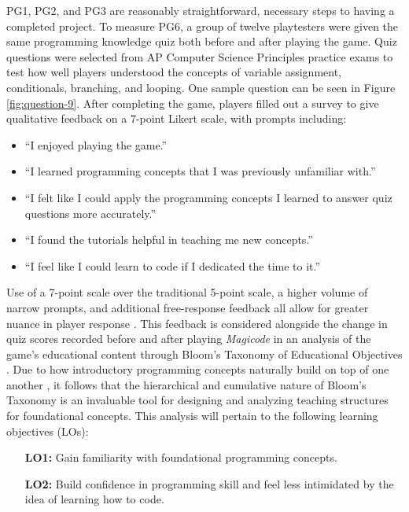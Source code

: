 \documentclass[10pt,twocolumn]{article}
\begin{document}
PG1, PG2, and PG3 are reasonably straightforward, necessary steps to having a completed project. To measure PG6, a group of twelve playtesters were given the same programming knowledge quiz both before and after playing the game. Quiz questions were selected from AP Computer Science Principles practice exams \cite{ap-practice-exam}\cite{ap-practice-website} to test how well players understood the concepts of variable assignment, conditionals, branching, and looping. One sample question can be seen in Figure \ref{fig:question-9}. After completing the game, players filled out a survey to give qualitative feedback on a 7-point Likert scale, with prompts including:

\begin{itemize}
    \item “I enjoyed playing the game.”
    \item “I learned programming concepts that I was previously unfamiliar with.”
    \item “I felt like I could apply the programming concepts I learned to answer quiz questions more accurately.”
    \item “I found the tutorials helpful in teaching me new concepts.”
    \item “I feel like I could learn to code if I dedicated the time to it.”
\end{itemize}

Use of a 7-point scale over the traditional 5-point scale, a higher volume of narrow prompts, and additional free-response feedback all allow for greater nuance in player response \cite{likert-explored}. This feedback is considered alongside the change in quiz scores recorded before and after playing \textit{Magicode} in an analysis of the game’s educational content through Bloom’s Taxonomy of Educational Objectives \cite{bloom-taxonomy}. Due to how introductory programming concepts naturally build on top of one another \cite{teaching-oop}, it follows that the hierarchical and cumulative nature of Bloom’s Taxonomy is an invaluable tool for designing and analyzing teaching structures for foundational concepts. This analysis will pertain to the following learning objectives (LOs):

\begin{itemize}[leftmargin=.5in]
    \item[\textbf{LO1:}] Gain familiarity with foundational programming concepts.
    \item[\textbf{LO2:}] Build confidence in programming skill and feel less intimidated by the idea of learning how to code.
\end{itemize}
\end{document}
